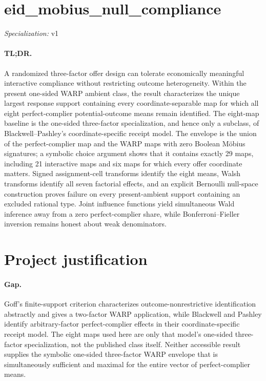 \documentclass{article}
\begin{document}
\sloppy

\section*{eid\_\allowbreak{}mobius\_\allowbreak{}null\_\allowbreak{}compliance}

\noindent\textit{Specialization:} v1\par

\paragraph{TL;DR.} A randomized three-factor offer design can tolerate economically meaningful interactive compliance without restricting outcome heterogeneity. Within the present one-sided WARP ambient class, the result characterizes the unique largest response support containing every coordinate-separable map for which all eight perfect-complier potential-outcome means remain identified. The eight-map baseline is the one-sided three-factor specialization, and hence only a subclass, of Blackwell--Pashley's coordinate-specific receipt model. The envelope is the union of the perfect-complier map and the WARP maps with zero Boolean Möbius signatures; a symbolic choice argument shows that it contains exactly 29 maps, including 21 interactive maps and six maps for which every offer coordinate matters. Signed assignment-cell transforms identify the eight means, Walsh transforms identify all seven factorial effects, and an explicit Bernoulli null-space construction proves failure on every present-ambient support containing an excluded rational type. Joint influence functions yield simultaneous Wald inference away from a zero perfect-complier share, while Bonferroni--Fieller inversion remains honest about weak denominators.

\section{Project justification}

\paragraph{Gap.} Goff's finite-support criterion characterizes outcome-nonrestrictive identification abstractly and gives a two-factor WARP application, while Blackwell and Pashley identify arbitrary-factor perfect-complier effects in their coordinate-specific receipt model. The eight maps used here are only that model's one-sided three-factor specialization, not the published class itself. Neither accessible result supplies the symbolic one-sided three-factor WARP envelope that is simultaneously sufficient and maximal for the entire vector of perfect-complier means.
\end{document}
